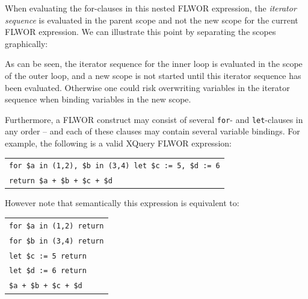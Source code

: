 When evaluating the for-clauses in this nested FLWOR expression, the
\textit{iterator sequence} is evaluated in the parent scope and not the
new scope for the current FLWOR expression. We can illustrate this point by
separating the scopes graphically:
\begin{figure}
\centering
{}
\end{figure}

As can be seen, the iterator sequence for the inner loop is evaluated in the
scope of the outer loop, and a new scope is not started until this iterator
sequence has been evaluated. Otherwise one could risk overwriting variables in
the iterator sequence when binding variables in the new scope.

Furthermore, a FLWOR construct may consist of several \texttt{for}- and
\texttt{let}-clauses in any order -- and each of these clauses may contain
several variable bindings. For example, the following is a valid XQuery
FLWOR expression:

\begin{center}
\begin{tabular}{l}
\texttt{for \$a in (1,2), \$b in (3,4) let \$c := 5, \$d := 6} \\ \quad
  \texttt{return \$a + \$b + \$c + \$d} \\
\end{tabular}
\end{center}

However note that semantically this expression is equivalent to:

\begin{center}
\begin{tabular}{l}
\texttt{for \$a in (1,2) return} \\ \quad
  \texttt{for \$b in (3,4) return} \\ \quad \quad
    \texttt{let \$c := 5 return} \\ \quad \quad \quad 
      \texttt{let \$d := 6 return} \\ \quad \quad \quad \quad 
        \texttt{\$a + \$b + \$c + \$d} \\
\end{tabular}
\end{center}

